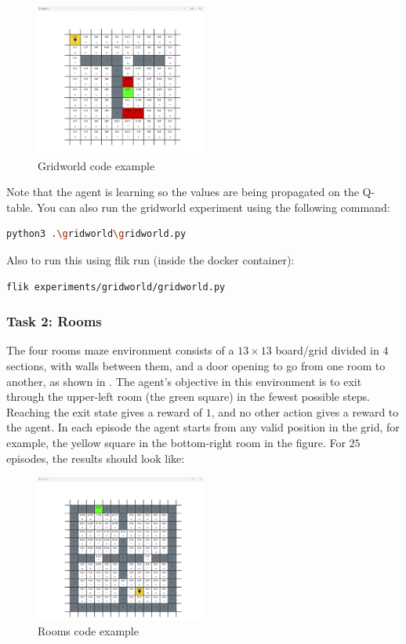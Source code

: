 \begin{figure}[H]
    \centering
    \includegraphics[width=0.5\textwidth]{figures/gridworld_example.png}
    \caption{Gridworld code example}
    \label{fig:gridworld-code-example}
\end{figure}

Note that the agent is learning so the values are being propagated on the Q-table. You can also run 
the gridworld experiment using the following command:

\begin{lstlisting}[language=bash]
python3 .\gridworld\gridworld.py
\end{lstlisting}

Also to run this using flik run (inside the docker container):

\begin{lstlisting}[language=bash]
flik experiments/gridworld/gridworld.py
\end{lstlisting}

\subsubsection{Task 2: Rooms}

The four rooms maze environment consists of a $13\times 13$ board/grid divided in $4$ sections, with walls 
between them, and a door opening to go from one room to another, as shown in . 
The agent's objective in this environment is to exit through the upper-left room (the green square) 
in the fewest possible steps. Reaching the exit state gives a reward of $1$, and no other action gives a 
reward to the agent. In each episode the agent starts from any valid position in the grid, for example, 
the yellow square in the bottom-right room in the figure. For $25$ episodes, the results should look like:

\begin{figure}[H]
    \centering
    \includegraphics[width=0.5\textwidth]{figures/rooms_example.png}
    \caption{Rooms code example}
    \label{fig:rooms-code-example}
\end{figure}

